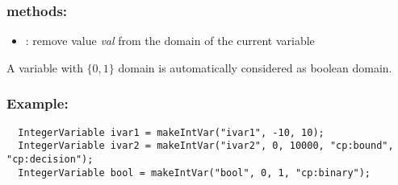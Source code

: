 \subsubsection{methods:}
      \begin{itemize}
      \item {}: remove value \emph{val} from the domain of the current variable
      \end{itemize}

A variable with $\{0,1\}$ domain is automatically considered as boolean domain.

\subsubsection{Example:}
\begin{lstlisting}
  IntegerVariable ivar1 = makeIntVar("ivar1", -10, 10);
  IntegerVariable ivar2 = makeIntVar("ivar2", 0, 10000, "cp:bound", "cp:decision");
  IntegerVariable bool = makeIntVar("bool", 0, 1, "cp:binary");
\end{lstlisting} 

